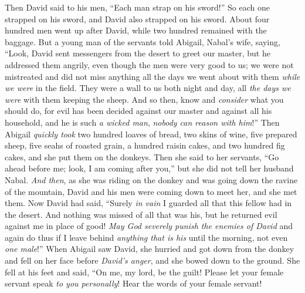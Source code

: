 \begin{biblechapter}
\verse Then David said to his men, “Each man strap on his sword!” So each one strapped on his sword, and David also strapped on his sword. About four hundred men went up after David, while two hundred remained with the baggage.
\verse But a young man of the servants told Abigail, Nabal’s wife, saying, “Look, David sent messengers from the desert to greet our master, but he addressed them angrily,
\verse even though the men were very good to us; we were not mistreated and did not miss anything all the days we went about with them \textit{while we were} in the field.
\verse They were a wall to us both night and day, all \textit{the days we were} with them keeping the sheep.
\verse And so then, know and \textit{consider} what you should do, for evil has been decided against our master and against all his household, and he is such \textit{a wicked man}, \textit{nobody can reason with him}!”
\verse Then Abigail \textit{quickly took} two hundred loaves of bread, two skins of wine, five prepared sheep, five seahs of roasted grain, a hundred raisin cakes, and two hundred fig cakes, and she put them on the donkeys.
\verse Then she said to her servants, “Go ahead before me; look, I am coming after you,” but she did not tell her husband Nabal.
\verse \textit{And then}, as she was riding on the donkey and was going down the ravine of the mountain, David and his men were coming down to meet her, and she met them.
\verse Now David had said, “Surely \textit{in vain} I guarded all that this fellow had in the desert. And nothing was missed of all that was his, but he returned evil against me in place of good!
\verse \textit{May God severely punish the enemies of David} and again do thus if I leave behind \textit{anything that is his} until the morning, not even \textit{one male}!”
\verse When Abigail saw David, she hurried and got down from the donkey and fell on her face before \textit{David’s anger}, and she bowed down to the ground.
\verse She fell at his feet and said, “On me, my lord, be the guilt! Please let your female servant speak \textit{to you personally}! Hear the words of your female servant!

\end{biblechapter}
